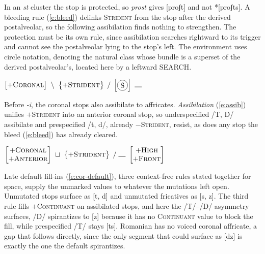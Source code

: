 \documentclass[11pt,letterpaper]{article}
\newcommand{\gap}{\rule{1em}{0.5pt}}
\newcommand{\word}[1]{\textit{#1}}
\newcommand{\term}[1]{\textit{#1}}
\newcommand{\feature}[1]{\textsc{#1}}
\newcommand{\featspec}[2]{\ensuremath{#1}\textsc{#2}}
\newcommand*\circled[1]{\tikz[baseline=(char.base)]{
            \node[shape=circle,draw,inner sep=2pt] (char) {#1};}}
\begin{document}
\noindent
In an \word{st} cluster the stop is protected, so \word{prost} gives [proʃt] and not *[proʃts].
A bleeding rule (\ref{e:bleed}) delinks \feature{Strident} from the stop after the derived postalveolar, so the following assibilation finds nothing to strengthen.
The protection must be its own rule, since assibilation searches rightward to its trigger and cannot see the postalveolar lying to the stop's left.
The environment uses circle notation, \circled{S} denoting the natural class whose bundle is a superset of the derived postalveolar's, located here by a leftward SEARCH.

\begin{unlabeledexample}
\small\hfill$\displaystyle
\begin{bmatrix}
\featspec{+}{Coronal}
\end{bmatrix}
~\setminus~
\begin{Bmatrix}
\featspec{+}{Strident}
\end{Bmatrix}
\;/\;
\begin{bmatrix}
\circled{S}
\end{bmatrix}
~\gap
$\hfill\null
\label{e:bleed}
\end{unlabeledexample}

\noindent
Before \word{-i}, the coronal stops also assibilate to affricates.
\term{Assibilation} (\ref{e:assib}) unifies \featspec{+}{Strident} into an anterior coronal stop, so underspecified /T, D/ assibilate and prespecified /t, d/, already \featspec{-}{Strident}, resist, as does any stop the bleed (\ref{e:bleed}) has already cleared.

\begin{unlabeledexample}
\small\hfill$\displaystyle
\begin{bmatrix}
\featspec{+}{Coronal}\\
\featspec{+}{Anterior}
\end{bmatrix}
~\sqcup~
\begin{Bmatrix}
\featspec{+}{Strident}
\end{Bmatrix}
\;/\;\gap~
\begin{bmatrix}
\featspec{+}{High}\\
\featspec{+}{Front}
\end{bmatrix}
$\hfill\null
\label{e:assib}
\end{unlabeledexample}

\noindent
Late default fill-ins (\ref{e:cor-default}), three context-free rules stated together for space, supply the unmarked values to whatever the mutations left open.
Unmutated stops surface as [t, d] and unmutated fricatives as [s, z].
The third rule fills \featspec{+}{Continuant} on assibilated stops, and here the /T/--/D/ asymmetry surfaces, /D/ spirantizes to [z] because it has no \feature{Continuant} value to block the fill, while prespecified /T/ stays [ts].
Romanian has no voiced coronal affricate, a gap that follows directly, since the only segment that could surface as [dz] is exactly the one the default spirantizes.
\end{document}

